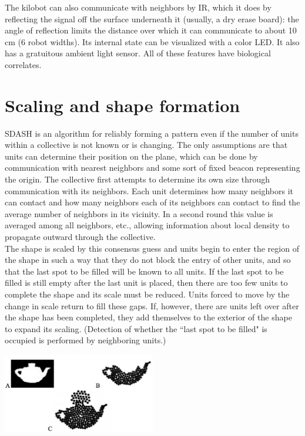 \documentclass{article}
\begin{document}
The kilobot can also communicate with neighbors by IR, which it does by reflecting the signal off the surface underneath it (usually, a dry erase board): the angle of reflection limits the distance over which it can communicate to about 10 cm (6 robot widths). Its internal state can be visualized with a color LED. It also has a gratuitous ambient light sensor. All of these features have biological correlates.

\section*{Scaling and shape formation}

SDASH is an algorithm for reliably forming a pattern even if the number of units within a collective is not known or is changing. The only assumptions are that units can determine their position on the plane, which can be done by communication with nearest neighbors and some sort of fixed beacon representing the origin. The collective first attempts to determine its own size through communication with its neighbors. Each unit determines how many neighbors it can contact and how many neighbors each of its neighbors can contact to find the average number of neighbors in its vicinity. In a second round this value is averaged among all neighbors, etc., allowing information about local density to propagate outward through the collective.\\

The shape is scaled by this consensus guess and units begin to enter the region of the shape in such a way that they do not block the entry of other units, and so that the last spot to be filled will be known to all units. If the last spot to be filled is still empty after the last unit is placed, then there are too few units to complete the shape and its scale must be reduced. Units forced to move by the change in scale return to fill these gaps. If, however, there are units left over after the shape has been completed, they add themselves to the exterior of the shape to expand its scaling. (Detection of whether the ``last spot to be filled" is occupied is performed by neighboring units.)

\begin{center}
\includegraphics[width=0.5\textwidth]{sdash_errors.pdf}
\end{center}
\end{document}
